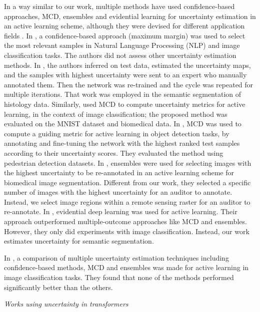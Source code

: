 In a way similar to our work, multiple methods have used confidence-based approaches, MCD, ensembles and evidential learning for uncertainty estimation in an active learning scheme, although they were devised for different application fields \cite{zhdanov2019diverse, di2019deep, gal2017deep, kirsch2019batchbald, aghdam2019active, ren2021survey, yang2017suggestive, hemmer2022deal}. In \cite{zhdanov2019diverse}, a confidence-based approach (maximum margin) was used to select the most relevant samples in Natural Language Processing (NLP) and image classification tasks. The authors did not assess other uncertainty estimation methods. In \cite{di2019deep}, the authors inferred on test data, estimated the uncertainty maps, and the samples with highest uncertainty were sent to an expert who manually annotated them. Then the network was re-trained and the cycle was repeated for multiple iterations. That work was employed in the semantic segmentation of histology data. Similarly, \cite{gal2017deep} used MCD to compute uncertainty metrics for active learning, in the context of image classification; the proposed method was evaluated on the MNIST dataset and biomedical data. In \cite{aghdam2019active}, MCD was used to compute a guiding metric for active learning in object detection tasks, by annotating and fine-tuning the network with the highest ranked test samples according to their uncertainty scores. They evaluated the method using pedestrian detection datasets. In \cite{yang2017suggestive}, ensembles were used for selecting images with the highest uncertainty to be re-annotated in an active learning scheme for biomedical image segmentation. Different from our work, they selected a specific number of images with the highest uncertainty for an auditor to annotate. Instead, we select image regions within a remote sensing raster for an auditor to re-annotate. In \cite{hemmer2022deal}, evidential deep learning was used for active learning. Their approach outperformed multiple-outcome approaches like MCD and ensembles. However, they only did experiments with image classification. Instead, our work estimates uncertainty for semantic segmentation. 

In \cite{zhan2022comparative}, a comparison of multiple uncertainty estimation techniques including confidence-based methods, MCD and ensembles was made for active learning in image classification tasks. They found that none of the methods performed significantly better than the others.


\textit{Works using uncertainty in transformers}

